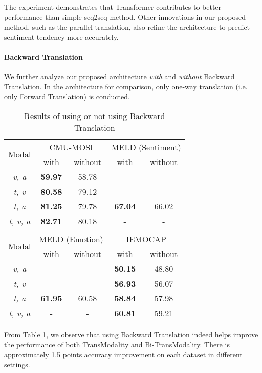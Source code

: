 \documentclass[sigconf]{acmart}
\begin{document}
	The experiment demonstrates that Transformer contributes to better performance than simple seq2seq method. Other innovations in our proposed method, such as the parallel translation, also refine the architecture to predict sentiment tendency more accurately. 

	\paragraph{Backward Translation}
	We further analyze our proposed architecture \textit{with} and \textit{without} Backward Translation. In the architecture for comparison, only one-way translation (i.e. only Forward Translation) is conducted.
	\begin{table}[t]
		\centering
		\caption{Results of using or not using Backward Translation}
		\begin{tabular}{|c|cc|cc|}
			\hline
			\multirow{2}[4]{*}{Modal} & \multicolumn{2}{c|}{CMU-MOSI} & \multicolumn{2}{c|}{MELD (Sentiment)} \\
		\cline{2-5}          & with  & without & with  & without \\
			\hline
			\hline
			\textit{{v, a}} & \textbf{59.97} & 58.78 & -     & - \\
			\textit{{t, v}} & \textbf{80.58} & 79.12 & -     & - \\
			\textit{{t, a}} & \textbf{81.25} & 79.78 & \textbf{67.04} & 66.02 \\
			\hline
			\textit{{t, v, a}} & \textbf{82.71} & 80.18 & -     & - \\
			\hline
			\multicolumn{1}{r}{} &       & \multicolumn{1}{r}{} &       & \multicolumn{1}{r}{} \\
			\hline
			\multirow{2}[4]{*}{Modal} & \multicolumn{2}{c|}{MELD (Emotion)} & \multicolumn{2}{c|}{IEMOCAP} \\
		\cline{2-5}          & with  & without & with  & without \\
			\hline
			\hline
			\textit{{v, a}} & -     & -     & \textbf{50.15} & 48.80 \\
			\textit{{t, v}} & -     & -     & \textbf{56.93} & 56.07 \\
			\textit{{t, a}} & \textbf{61.95} & 60.58 & \textbf{58.84} & 57.98 \\
			\hline
			\textit{{t, v, a}} & -     & -     & \textbf{60.81} & 59.21 \\
			\hline
			\end{tabular}\label{tab:compareab}\end{table}From Table \ref{tab:compareab}, we observe that using Backward Translation indeed helps improve the performance of both TransModality and Bi-TransModality. There is approximately 1.5 points accuracy improvement on each dataset in different settings. 
\end{document}
